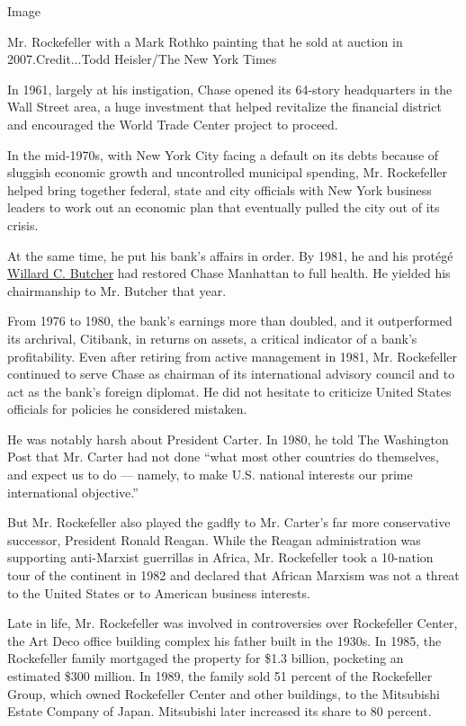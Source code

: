 Image

Mr. Rockefeller with a Mark Rothko painting that he sold at auction in
2007.Credit...Todd Heisler/The New York Times

In 1961, largely at his instigation, Chase opened its 64-story
headquarters in the Wall Street area, a huge investment that helped
revitalize the financial district and encouraged the World Trade Center
project to proceed.

In the mid-1970s, with New York City facing a default on its debts
because of sluggish economic growth and uncontrolled municipal spending,
Mr. Rockefeller helped bring together federal, state and city officials
with New York business leaders to work out an economic plan that
eventually pulled the city out of its crisis.

At the same time, he put his bank's affairs in order. By 1981, he and
his protégé
\href{http://dealbook.nytimes3xbfgragh.onion/2012/08/27/willard-c-butcher-former-chief-of-chase-manhattan-dies-at-85/}{Willard
C. Butcher} had restored Chase Manhattan to full health. He yielded his
chairmanship to Mr. Butcher that year.

From 1976 to 1980, the bank's earnings more than doubled, and it
outperformed its archrival, Citibank, in returns on assets, a critical
indicator of a bank's profitability. Even after retiring from active
management in 1981, Mr. Rockefeller continued to serve Chase as chairman
of its international advisory council and to act as the bank's foreign
diplomat. He did not hesitate to criticize United States officials for
policies he considered mistaken.

He was notably harsh about President Carter. In 1980, he told The
Washington Post that Mr. Carter had not done ``what most other countries
do themselves, and expect us to do --- namely, to make U.S. national
interests our prime international objective.''

But Mr. Rockefeller also played the gadfly to Mr. Carter's far more
conservative successor, President Ronald Reagan. While the Reagan
administration was supporting anti-Marxist guerrillas in Africa, Mr.
Rockefeller took a 10-nation tour of the continent in 1982 and declared
that African Marxism was not a threat to the United States or to
American business interests.

Late in life, Mr. Rockefeller was involved in controversies over
Rockefeller Center, the Art Deco office building complex his father
built in the 1930s. In 1985, the Rockefeller family mortgaged the
property for \$1.3 billion, pocketing an estimated \$300 million. In
1989, the family sold 51 percent of the Rockefeller Group, which owned
Rockefeller Center and other buildings, to the Mitsubishi Estate Company
of Japan. Mitsubishi later increased its share to 80 percent.

